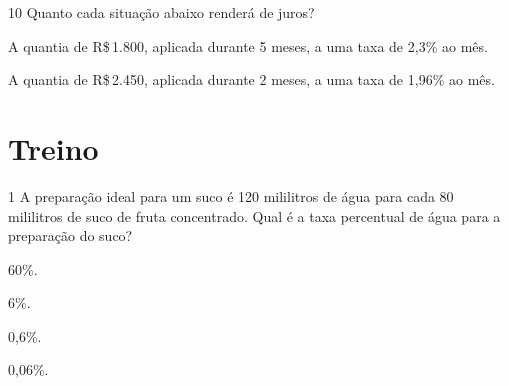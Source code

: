 \num{10} Quanto cada situação abaixo renderá de juros?

\begin{escolha}[itemsep=0pt]
\item{A quantia de R\$\,1.800, aplicada durante 5 meses, a uma taxa de 2,3\% ao mês.}





\item{A quantia de R\$\,2.450, aplicada durante 2 meses, a uma taxa de 1,96\% ao mês.}



\end{escolha}

\section*{Treino}

\num{1} A preparação ideal para um suco é 120 mililitros de água para cada 80
mililitros de suco de fruta concentrado. Qual é a taxa percentual de
água para a preparação do suco?

\begin{escolha}[itemsep=0pt]
\item 60\%.
\item 6\%.
\item 0,6\%.
\item 0,06\%.
\end{escolha}







